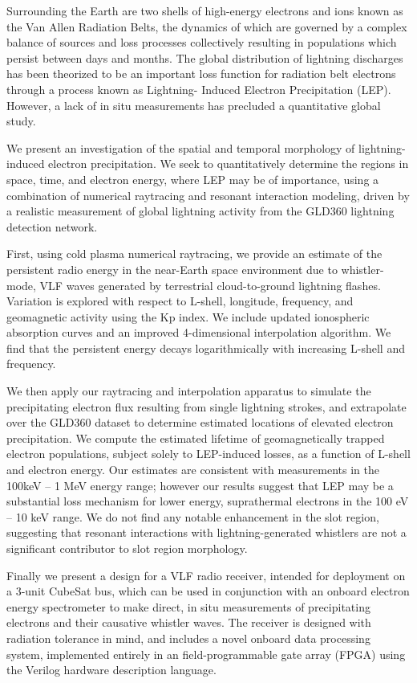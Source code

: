 Surrounding the Earth are two shells of high-energy electrons and ions known as the Van Allen Radiation Belts, the dynamics of which are governed by a complex balance of sources and loss processes collectively resulting in populations which persist between days and months. The global distribution of lightning discharges has been theorized to be an important loss function for radiation belt electrons through a process known as Lightning- Induced Electron Precipitation (LEP). However, a lack of in situ measurements has precluded a quantitative global study. 

We present an investigation of the spatial and temporal morphology of lightning-induced electron precipitation. We seek to quantitatively determine the regions in space, time, and electron energy, where LEP may be of importance, using a combination of numerical raytracing and resonant interaction modeling, driven by a realistic measurement of global lightning activity from the GLD360 lightning detection network.

First, using cold plasma numerical raytracing, we provide an estimate of the persistent radio energy in the near-Earth space environment due to whistler-mode, VLF waves generated by terrestrial cloud-to-ground lightning flashes. Variation is explored with respect to L-shell, longitude, frequency, and geomagnetic activity using the Kp index. We include updated ionospheric absorption curves and an improved 4-dimensional interpolation algorithm. We find that the persistent energy decays logarithmically with increasing L-shell and frequency.

We then apply our raytracing and interpolation apparatus to simulate the precipitating electron flux resulting from single lightning strokes, and extrapolate over the GLD360 dataset to determine estimated locations of elevated electron precipitation. We compute the estimated lifetime of geomagnetically trapped electron populations, subject solely to LEP-induced losses, as a function of L-shell and electron energy. Our estimates are consistent with measurements in the 100keV -- 1 MeV energy range; however our results suggest that LEP may be a substantial loss mechanism for lower energy, suprathermal electrons in the 100 eV -- 10 keV range. We do not find any notable enhancement in the slot region, suggesting that resonant interactions with lightning-generated whistlers are not a significant contributor to slot region morphology.

Finally we present a design for a VLF radio receiver, intended for deployment on a 3-unit CubeSat bus, which can be used in conjunction with an onboard electron energy spectrometer to make direct, in situ measurements of precipitating electrons and their causative whistler waves. The receiver is designed with radiation tolerance in mind, and includes a novel onboard data processing system, implemented entirely in an field-programmable gate array (FPGA) using the Verilog hardware description language.